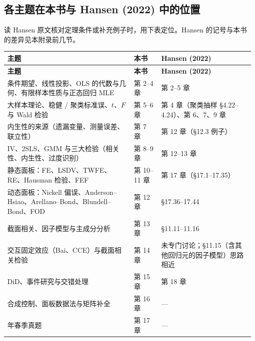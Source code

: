 \subsection{各主题在本书与 Hansen (2022) 中的位置}

读 Hansen 原文核对定理条件或补充例子时，用下表定位。Hansen 的记号与本书的差异见本附录前几节。

{\renewcommand{\arraystretch}{1.15}\begin{longtable}{@{}>{\raggedright\arraybackslash\small}p{6.6cm}>{\raggedright\arraybackslash\small}p{2.6cm}>{\raggedright\arraybackslash\small}p{6.2cm}@{}}
\toprule
\textbf{主题} & \textbf{本书} & \textbf{Hansen (2022)}\\
\midrule
\endfirsthead
\toprule
\textbf{主题} & \textbf{本书} & \textbf{Hansen (2022)}\\
\midrule
\endhead
\bottomrule
\endlastfoot
条件期望、线性投影、OLS 的代数与几何、有限样本性质与正态回归 MLE & 第 2–4 章 & 第 2–5 章\\
\addlinespace[1pt]
大样本理论、稳健 / 聚类标准误、$t$、$F$ 与 Wald 检验 & 第 5–6 章 & 第 4 章（聚类抽样 §4.22–4.24）、第 6、7、9 章\\
\addlinespace[1pt]
内生性的来源（遗漏变量、测量误差、联立性） & 第 7 章 & 第 12 章（§12.3 例子）\\
\addlinespace[1pt]
IV、2SLS、GMM 与三大检验（相关性、内生性、过度识别） & 第 8–9 章 & 第 12–13 章\\
\addlinespace[1pt]
静态面板：FE、LSDV、TWFE、RE、Hausman 检验、FEF & 第 10–11 章 & 第 17 章（§17.1–17.35）\\
\addlinespace[1pt]
动态面板：Nickell 偏误、Anderson–Hsiao、Arellano–Bond、Blundell–Bond、FOD & 第 12 章 & §17.36–17.44\\
\addlinespace[1pt]
截面相关、因子模型与主成分分析 & 第 13 章 & §11.11–11.16\\
\addlinespace[1pt]
交互固定效应（Bai、CCE）与截面相关检验 & 第 14 章 & 未专门讨论；§11.15（含其他回归元的因子模型）思路相近\\
\addlinespace[1pt]
DiD、事件研究与交错处理 & 第 15 章 & 第 18 章\\
\addlinespace[1pt]
合成控制、面板数据法与矩阵补全 & 第 16 章 & —\\
\addlinespace[1pt]
2025 年春季真题 & 第 17 章 & —\\
\end{longtable}}
